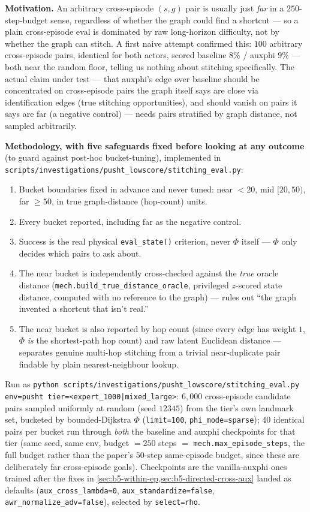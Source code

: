 \documentclass[11pt]{article}
\begin{document}
\textbf{Motivation.} An arbitrary cross-episode $(s,g)$ pair is usually just \emph{far} in a
$250$-step-budget sense, regardless of whether the graph could find a shortcut --- so a plain
cross-episode eval is dominated by raw long-horizon difficulty, not by whether the graph can
stitch. A first naive attempt confirmed this: $100$ arbitrary cross-episode pairs, identical for
both actors, scored baseline $8\%$ / auxphi $9\%$ --- both near the random floor, telling us
nothing about stitching specifically. The actual claim under test --- that auxphi's edge over
baseline should be concentrated on cross-episode pairs the graph itself says are close via
identification edges (true stitching opportunities), and should vanish on pairs it says are far
(a negative control) --- needs pairs stratified by graph distance, not sampled arbitrarily.

\textbf{Methodology, with five safeguards fixed before looking at any outcome} (to guard against
post-hoc bucket-tuning), implemented in
\texttt{scripts/investigations/pusht\_lowscore/stitching\_eval.py}:
\begin{enumerate}[leftmargin=1.4em,itemsep=2pt]
\item Bucket boundaries fixed in advance and never tuned: near $<20$, mid $[20,50)$, far $\ge
50$, in true graph-distance (hop-count) units.
\item Every bucket reported, including far as the negative control.
\item Success is the real physical \texttt{eval\_state()} criterion, never $\Phi$ itself ---
$\Phi$ only decides which pairs to ask about.
\item The near bucket is independently cross-checked against the \emph{true} oracle distance
(\texttt{mech.build\_true\_distance\_oracle}, privileged $z$-scored state distance, computed
with no reference to the graph) --- rules out ``the graph invented a shortcut that isn't real.''
\item The near bucket is also reported by hop count (since every edge has weight $1$, $\Phi$
\emph{is} the shortest-path hop count) and raw latent Euclidean distance --- separates genuine
multi-hop stitching from a trivial near-duplicate pair findable by plain nearest-neighbour
lookup.
\end{enumerate}
Run as \texttt{python scripts/investigations/pusht\_lowscore/stitching\_eval.py env=pusht
tier=<expert\_1000|mixed\_large>}: $6{,}000$ cross-episode candidate pairs sampled uniformly at
random (seed $12345$) from the tier's own landmark set, bucketed by bounded-Dijkstra $\Phi$
(\texttt{limit=100}, \texttt{phi\_mode=sparse}); $40$ identical pairs per bucket run through
\emph{both} the baseline and auxphi checkpoints for that tier (same seed, same env, budget
$=250$ steps $=$ \texttt{mech.max\_episode\_steps}, the full budget rather than the paper's
$50$-step same-episode budget, since these are deliberately far cross-episode goals).
Checkpoints are the vanilla-auxphi ones trained after the fixes in
\cref{sec:b5-within-ep,sec:b5-directed-cross-aux} landed as defaults
(\texttt{aux\_cross\_lambda=0}, \texttt{aux\_standardize=false}, \texttt{awr\_normalize\_adv=false}),
selected by \texttt{select=rho}.
\end{document}
